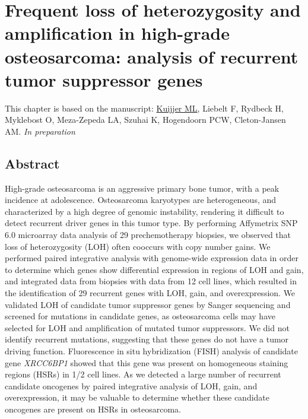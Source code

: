 

%


\chapter{Frequent loss of heterozygosity and amplification in high-grade osteosarcoma: analysis of recurrent tumor suppressor genes}\label{ch8}
\thispagestyle{empty}				%

\vfill

\vspace{0.5cm}
This chapter is based on the manuscript:
\underline{Kuijjer ML}, Liebelt F, Rydbeck H, Myklebost O, Meza-Zepeda LA, Szuhai K, Hogendoorn PCW, Cleton-Jansen AM. \emph{In preparation}

\newpage


\section{Abstract}\label{abstract8}
High-grade osteosarcoma is an aggressive primary bone tumor, with a peak incidence at adolescence. Osteosarcoma karyotypes are heterogeneous, and characterized by a high degree of genomic instability, rendering it difficult to detect recurrent driver genes in this tumor type. By performing Affymetrix SNP 6.0 microarray data analysis of 29 prechemotherapy biopsies, we observed that loss of heterozygosity (LOH) often cooccurs with copy number gains. We performed paired integrative analysis with genome\hyp{}wide expression data in order to determine which genes show differential expression in regions of LOH and gain, and integrated data from biopsies with data from 12 cell lines, which resulted in the identification of 29 recurrent genes with LOH, gain, and overexpression. We validated LOH of candidate tumor suppressor genes by Sanger sequencing and screened for mutations in candidate genes, as osteosarcoma cells may have selected for LOH and amplification of mutated tumor suppressors. We did not identify recurrent mutations, suggesting that these genes do not have a tumor driving function. Fluorescence in situ hybridization (FISH) analysis of candidate gene {\it XRCC6BP1} showed that this gene was present on homogeneous staining regions (HSRs) in 1/2 cell lines. As we detected a large number of recurrent candidate oncogenes by paired integrative analysis of LOH, gain, and overexpression, it may be valuable to determine whether these candidate oncogenes are present on HSRs in osteosarcoma.

